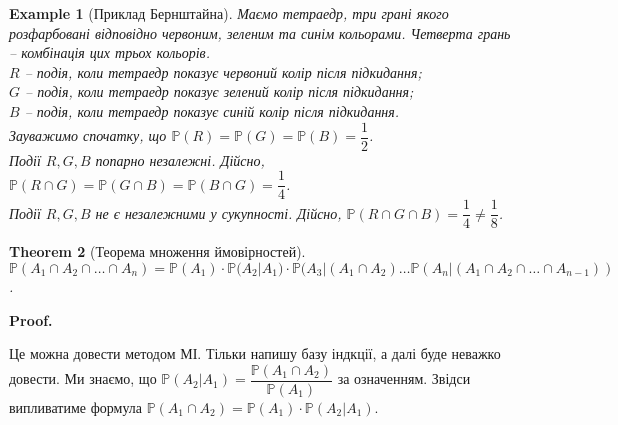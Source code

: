 \documentclass[a4paper, 10pt]{article}
\makeatletter
\theoremstyle{theoremdd}
\newtheorem{theorem}{Theorem}[subsection]
\newtheorem{example}[theorem]{Example}
\renewenvironment{proof}[1][Proof.\\]{\par
\pushQED{\hfill \qed}%
\normalfont \topsep6\p@\@plus6\p@\relax
\trivlist
\item\relax
{\bfseries
#1\@addpunct{.}}\hspace\labelsep\ignorespaces
}{%
\popQED\endtrivlist\@endpefalse
}
\makeatother
\begin{document}
\begin{example}[Приклад Бернштайна]
Маємо тетраедр, три грані якого розфарбовані відповідно червоним, зеленим та синім кольорами. Четверта грань -- комбінація цих трьох кольорів.\\
$R$ -- подія, коли тетраедр показує червоний колір після підкидання;\\
$G$ -- подія, коли тетраедр показує зелений колір після підкидання;\\
$B$ -- подія, коли тетраедр показує синій колір після підкидання.\\
Зауважимо спочатку, що $\mathbb{P}(R) = \mathbb{P}(G) = \mathbb{P}(B) = \dfrac{1}{2}$.\\
Події $R,G,B$ попарно незалежні. Дійсно, $\mathbb{P}(R \cap G) = \mathbb{P}(G \cap B) = \mathbb{P}(B \cap G) = \dfrac{1}{4}$.\\
Події $R,G,B$ не є незалежними у сукупності. Дійсно, $\mathbb{P}(R \cap G \cap B) = \dfrac{1}{4} \neq \dfrac{1}{8}$.
\end{example}

\begin{theorem}[Теорема множення ймовірностей]
$\displaystyle\mathbb{P}\left( A_1 \cap A_2 \cap \dots \cap A_n \right) = \mathbb{P}(A_1) \cdot \mathbb{P}(A_2 | A_1) \cdot \mathbb{P}(A_3 | (A_1 \cap A_2) \dots \mathbb{P}(A_n | (A_1 \cap A_2 \cap \dots \cap A_{n-1}))$.
\end{theorem}

\begin{proof}
Це можна довести методом МІ. Тільки напишу базу індкції, а далі буде неважко довести. Ми знаємо, що $\mathbb{P}(A_2 | A_1) = \dfrac{\mathbb{P}(A_1 \cap A_2)}{\mathbb{P}(A_1)}$ за означенням. Звідси випливатиме формула $\mathbb{P}(A_1 \cap A_2) = \mathbb{P}(A_1) \cdot \mathbb{P}(A_2 | A_1)$.
\end{proof}
\end{document}
